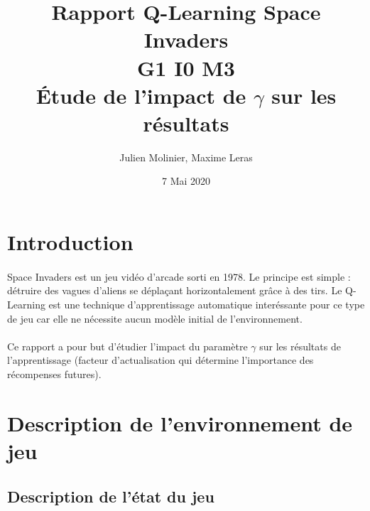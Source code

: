 \documentclass[12pt,oneside,a4paper]{article}
\begin{document}
    \title{Rapport Q-Learning Space Invaders \\ \vspace*{3mm}G1 I0 M3 \large  \vspace*{7mm}\\ Étude de l'impact de $\gamma$ sur les résultats}

    \author{Julien Molinier, Maxime Leras}
    \date{7 Mai 2020}
    \maketitle\thispagestyle{empty}

    \newpage
    \clearpage
    \thispagestyle{empty}
    \renewcommand*\contentsname{Sommaire}
    \tableofcontents
    \newpage

    \pagestyle{fancy}
    \cfoot{\thepage}
    \fancyhead{}
    \fancyhead[R]{\leftmark}



    \section{Introduction}

    \paragraph{}
    Space Invaders est un jeu vidéo d'arcade sorti en 1978. Le principe
    est simple : détruire des vagues d'aliens se déplaçant horizontalement
    grâce à des tirs.
    Le Q-Learning est une technique d'apprentissage automatique
    interéssante pour ce type de jeu car elle ne nécessite aucun modèle
    initial de l'environnement.

    \paragraph{}
    Ce rapport a pour but d'étudier l'impact du paramètre $\gamma$ sur
    les résultats de l'apprentissage (facteur d'actualisation qui détermine
    l'importance des récompenses futures).


    \section{Description de l'environnement de jeu}

    \subsection{Description de l'état du jeu}
\end{document}
